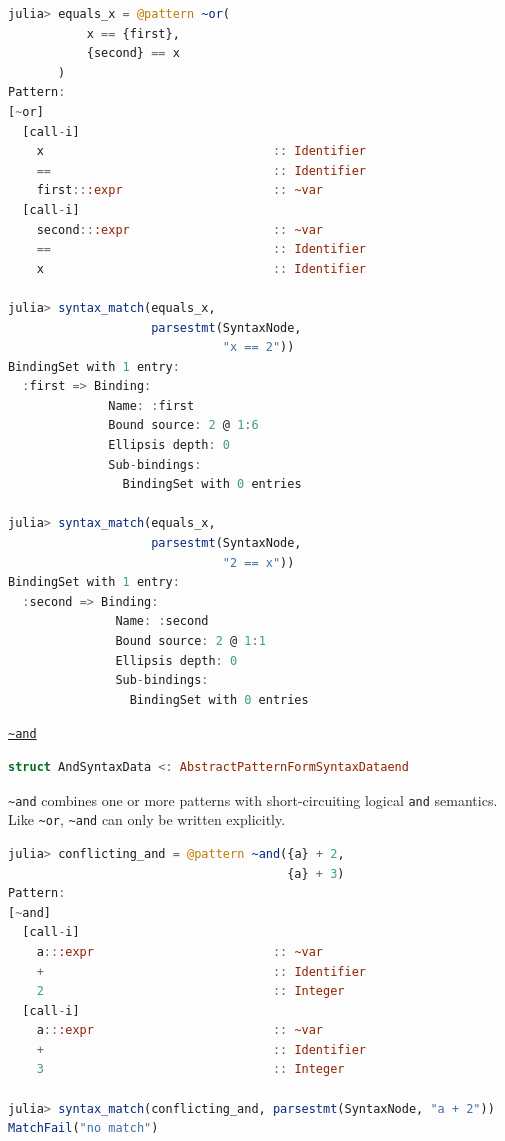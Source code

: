 \documentclass{juliacon}
\begin{document}
\begin{lstlisting}[language=Julia]
julia> equals_x = @pattern ~or(
           x == {first},
           {second} == x
       )
Pattern:
[~or]
  [call-i]
    x                                :: Identifier
    ==                               :: Identifier
    first:::expr                     :: ~var
  [call-i]
    second:::expr                    :: ~var
    ==                               :: Identifier
    x                                :: Identifier

julia> syntax_match(equals_x,
                    parsestmt(SyntaxNode,
                              "x == 2"))
BindingSet with 1 entry:
  :first => Binding:
              Name: :first
              Bound source: 2 @ 1:6
              Ellipsis depth: 0
              Sub-bindings:
                BindingSet with 0 entries

julia> syntax_match(equals_x,
                    parsestmt(SyntaxNode,
                              "2 == x"))
BindingSet with 1 entry:
  :second => Binding:
               Name: :second
               Bound source: 2 @ 1:1
               Ellipsis depth: 0
               Sub-bindings:
                 BindingSet with 0 entries
\end{lstlisting}

\vspace{0.2cm}
\label{orgfe488bd}\vspace{0.2cm}
\underline{\texttt{\textasciitilde{}and}}

\begin{lstlisting}[language=Julia]
struct AndSyntaxData <: AbstractPatternFormSyntaxDataend
\end{lstlisting}

\texttt{\textasciitilde{}and} combines one or more patterns with short-circuiting logical
\texttt{and} semantics. Like \texttt{\textasciitilde{}or}, \texttt{\textasciitilde{}and} can only be written explicitly.

\begin{lstlisting}[language=Julia]
julia> conflicting_and = @pattern ~and({a} + 2,
                                       {a} + 3)
Pattern:
[~and]
  [call-i]
    a:::expr                         :: ~var
    +                                :: Identifier
    2                                :: Integer
  [call-i]
    a:::expr                         :: ~var
    +                                :: Identifier
    3                                :: Integer

julia> syntax_match(conflicting_and, parsestmt(SyntaxNode, "a + 2"))
MatchFail("no match")
\end{lstlisting}
\end{document}
